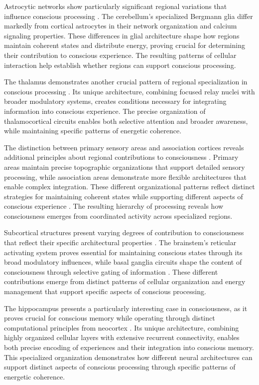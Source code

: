 Astrocytic networks show particularly significant regional variations that influence conscious processing \cite{Buckner2008}. The cerebellum's specialized Bergmann glia differ markedly from cortical astrocytes in their network organization and calcium signaling properties. These differences in glial architecture shape how regions maintain coherent states and distribute energy, proving crucial for determining their contribution to conscious experience. The resulting patterns of cellular interaction help establish whether regions can support conscious processing.

The thalamus demonstrates another crucial pattern of regional specialization in conscious processing \cite{Balleine2010}. Its unique architecture, combining focused relay nuclei with broader modulatory systems, creates conditions necessary for integrating information into conscious experience. The precise organization of thalamocortical circuits enables both selective attention and broader awareness, while maintaining specific patterns of energetic coherence.

The distinction between primary sensory areas and association cortices reveals additional principles about regional contributions to consciousness \cite{Shulman1997}. Primary areas maintain precise topographic organizations that support detailed sensory processing, while association areas demonstrate more flexible architectures that enable complex integration. These different organizational patterns reflect distinct strategies for maintaining coherent states while supporting different aspects of conscious experience \cite{Allen2016}. The resulting hierarchy of processing reveals how consciousness emerges from coordinated activity across specialized regions.

Subcortical structures present varying degrees of contribution to consciousness that reflect their specific architectural properties \cite{Lou2004}. The brainstem's reticular activating system proves essential for maintaining conscious states through its broad modulatory influences, while basal ganglia circuits shape the content of consciousness through selective gating of information \cite{Parvizi2001}. These different contributions emerge from distinct patterns of cellular organization and energy management that support specific aspects of conscious processing.

The hippocampus presents a particularly interesting case in consciousness, as it proves crucial for conscious memory while operating through distinct computational principles from neocortex \cite{Vogt2005}. Its unique architecture, combining highly organized cellular layers with extensive recurrent connectivity, enables both precise encoding of experiences and their integration into conscious memory. This specialized organization demonstrates how different neural architectures can support distinct aspects of conscious processing through specific patterns of energetic coherence.

